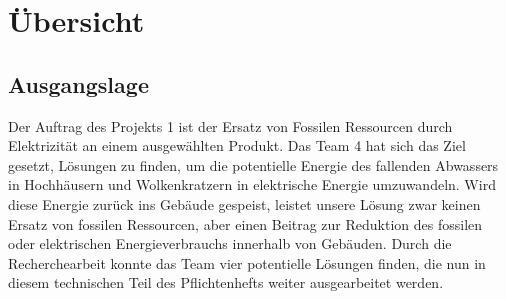 \section{Übersicht} \label{sec:uebersicht}
\subsection{Ausgangslage}
Der Auftrag des Projekts 1 ist der Ersatz von Fossilen Ressourcen durch Elektrizität an einem ausgewählten Produkt. Das Team 4 hat sich das Ziel gesetzt, Lösungen zu finden, um die potentielle Energie des fallenden Abwassers in Hochhäusern und Wolkenkratzern in elektrische Energie umzuwandeln. Wird diese Energie zurück ins Gebäude gespeist, leistet unsere Lösung zwar keinen Ersatz von fossilen Ressourcen, aber einen Beitrag zur Reduktion des fossilen oder elektrischen Energieverbrauchs innerhalb von Gebäuden.
Durch die Recherchearbeit konnte das Team vier potentielle Lösungen finden, die nun in diesem technischen Teil des Pflichtenhefts weiter ausgearbeitet werden.
\renewcommand\arraystretch{2}
